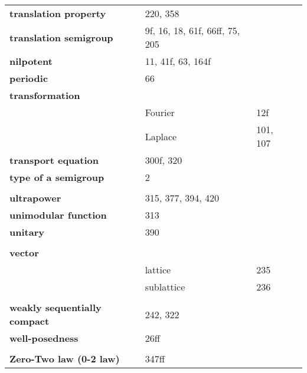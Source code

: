 \documentclass[10pt]{scrartcl}
\begin{document}
\begin{longtable}{>{\bfseries}p{4cm}p{4cm}p{4cm}p{4cm}}
translation property 	&  220, 358 \\
translation semigroup 	&  9f, 16, 18, 61f, 66ff, 75, 205 \\
nilpotent 	&  11, 41f, 63, 164f \\
periodic 	&  66 \\
transformation 	&  \\
	& Fourier 	&  12f \\
	& Laplace 	&  101, 107 \\
transport equation 	&  300f, 320 \\
type of a semigroup 	&  2 \\
\\
ultrapower 	&  315, 377, 394, 420 \\
unimodular function 	&  313 \\
unitary 	&  390 \\
\\
vector 	&  \\
	& lattice 	&  235 \\
	& sublattice 	&  236 \\
\\
weakly sequentially compact 	&  242, 322 \\
well-posedness 	&  26ff \\
\\
Zero-Two law (0-2 law) 	&  347ff \\

\end{longtable}
\end{document}
